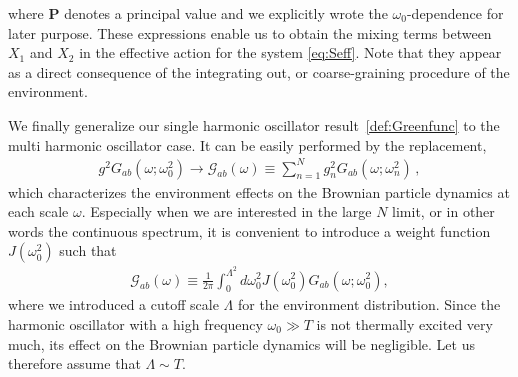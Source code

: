 \documentclass[a4paper,11pt]{article}
\begin{document}
where $\mathbf{P}$ denotes a principal value and we explicitly wrote the $\omega_0$-dependence for later purpose.
These expressions enable
us to obtain the mixing terms between $X_1$ and $X_2$ in 
the effective action for the system \eqref{eq:Seff}.
Note that they appear as a direct consequence of the integrating out, 
or coarse-graining procedure of the environment. 

\medskip
We finally generalize our single harmonic oscillator 
result~\eqref{def:Greenfunc} to the multi harmonic oscillator case.
It can be easily performed by the replacement,
\begin{align}
 g^2G_{ab} (\omega;\omega_0^2) 
  \to \mathcal{G}_{ab} (\omega)
  \equiv \sum_{n=1}^N g_n^2G_{ab} (\omega;\omega_n^2)\,,
\end{align}
which characterizes the environment effects on the Brownian particle dynamics at each scale $\omega$. Especially when we are interested in the large $N$ limit, or in other words the continuous spectrum, it is convenient to introduce a weight function $J(\omega_0^2)$ such that
\begin{align}
 \mathcal{G}_{ab} (\omega)
  \equiv \frac{1}{2\pi} \int_{0}^{\Lambda^{2}} d\omega_0^{2} 
 J(\omega_0^2) G_{ab} (\omega;\omega_0^2), 
 \label{eq:GreenMulticase} 
\end{align}
where we introduced a cutoff scale $\Lambda$ for the environment distribution. Since the harmonic oscillator with a high frequency $\omega_0\gg T$ is not thermally excited very much, its effect on the Brownian particle dynamics will be negligible. Let us therefore assume that $\Lambda\sim T$.
\end{document}
